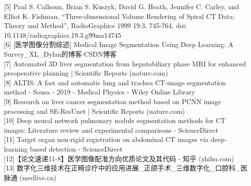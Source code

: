 \documentclass[12pt,a4paper]{report}
\begin{document}
[5] Paul S. Calhoun, Brian S. Kuszyk, David G. Heath, Jennifer C. Carley, and Elliot K. Fishman, “Three-dimensional Volume Rendering of Spiral CT Data: Theory and Method”, RadioGraphics 1999 19:3, 745-764, doi: 10.1148/radiographics.19.3.g99ma14745\\

[6] [医学图像分割综述] Medical Image Segmentation Using Deep Learning: A Survey\_XL\_Dylan的博客-CSDN博客\\

[7] Automated 3D liver segmentation from hepatobiliary phase MRI for enhanced preoperative planning | Scientific Reports (nature.com)\\

[8] ALTIS: A fast and automatic lung and trachea CT‐image segmentation method - Sousa - 2019 - Medical Physics - Wiley Online Library\\

[9] Research on liver cancer segmentation method based on PCNN image processing and SE-ResUnet | Scientific Reports (nature.com)\\

[10] Deep neural network pulmonary nodule segmentation methods for CT images: Literature review and experimental comparisons - ScienceDirect\\

[11] Target organ non-rigid registration on abdominal CT images via deep-learning based detection - ScienceDirect\\

[12]【论文速递11-8】医学图像配准方向优质论文及其代码 - 知乎 (zhihu.com)\\

[13] 数字化三维技术在正畸诊疗中的应用进展\_正颌手术\_三维数字化\_口腔科\_医脉通 (medlive.cn)
\end{document}

